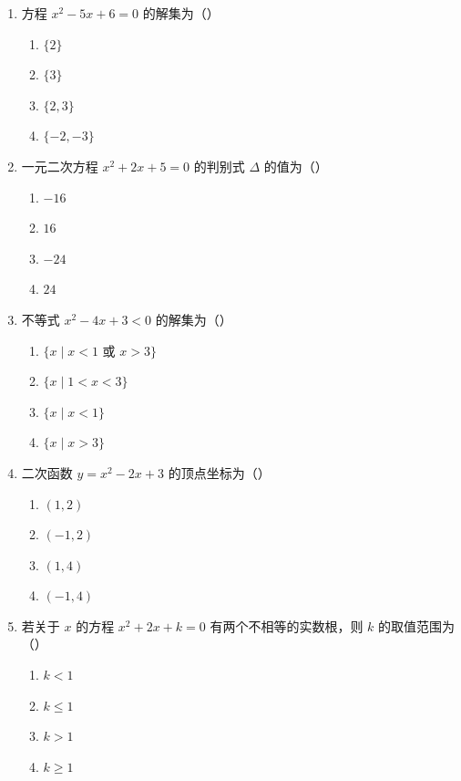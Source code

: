 \documentclass[12pt, a4paper]{ctexart}
\begin{document}
\begin{enumerate}
\item 方程 $x^2-5x+6=0$ 的解集为（\quad）
  \begin{enumerate}[label=\Alph*., itemsep=0pt]
    \item $\{2\}$ \quad \item $\{3\}$ \quad \item $\{2,3\}$ \quad \item $\{-2,-3\}$
  \end{enumerate}

\item 一元二次方程 $x^2+2x+5=0$ 的判别式 $\Delta$ 的值为（\quad）
  \begin{enumerate}[label=\Alph*., itemsep=0pt]
    \item $-16$ \quad \item $16$ \quad \item $-24$ \quad \item $24$
  \end{enumerate}

\item 不等式 $x^2-4x+3<0$ 的解集为（\quad）
  \begin{enumerate}[label=\Alph*., itemsep=0pt]
    \item $\{x\mid x<1 \text{ 或 } x>3\}$ \quad \item $\{x\mid 1<x<3\}$
    \item $\{x\mid x<1\}$ \quad \item $\{x\mid x>3\}$
  \end{enumerate}

\item 二次函数 $y=x^2-2x+3$ 的顶点坐标为（\quad）
  \begin{enumerate}[label=\Alph*., itemsep=0pt]
    \item $(1,2)$ \quad \item $(-1,2)$ \quad \item $(1,4)$ \quad \item $(-1,4)$
  \end{enumerate}

\item 若关于 $x$ 的方程 $x^2+2x+k=0$ 有两个不相等的实数根，则 $k$ 的取值范围为（\quad）
  \begin{enumerate}[label=\Alph*., itemsep=0pt]
    \item $k<1$ \quad \item $k\leq 1$ \quad \item $k>1$ \quad \item $k\geq 1$
  \end{enumerate}


\end{enumerate}
\end{document}
